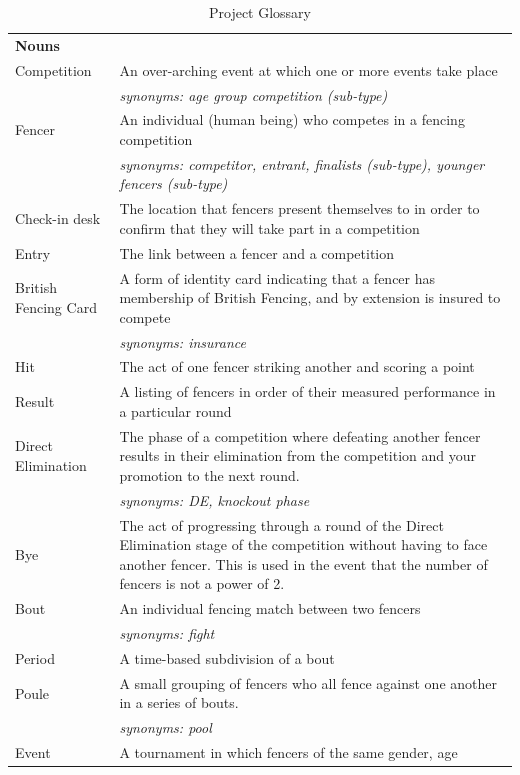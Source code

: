 \begin{center}
\begin{longtable}[l]{| p{} | p{} |} 
 \caption{\label{tab:ProjectGlossary}Project Glossary}
\hline
\textbf{Nouns} & \\ 
 Competition & An over-arching event at which one or more events
 take place \\
 & \textit{synonyms: age group competition (sub-type)} \\ 
 Fencer & An individual (human being) who competes in a fencing
 competition \\
 & \textit{synonyms: competitor, entrant, finalists (sub-type),
 younger fencers (sub-type)} \\
 Check-in desk & The location that fencers present themselves to
 in order to confirm that they will take part in a competition \\
 Entry & The link between a fencer and a competition \\
 British Fencing Card & A form of identity card indicating that a
 fencer has membership of British Fencing, and by extension is insured to
 compete \\
 & \textit{synonyms: insurance} \\
 Hit & The act of one fencer striking another and scoring a point \\
 Result & A listing of fencers in order of their measured performance in a 
 particular round \\
 Direct Elimination & The phase of a competition where defeating
 another fencer results in their elimination from the competition and your
 promotion to the next round. \\
 & \textit{synonyms: DE, knockout phase} \\
 Bye & The act of progressing through a round of the Direct
 Elimination stage of the competition without having to face another fencer.
 This is used in the event that the number of fencers is not a power of 2. \\
 Bout & An individual fencing match between two fencers \\
 & \textit{synonyms: fight} \\
 Period & A time-based subdivision of a bout \\
 Poule & A small grouping of fencers who all fence against one
 another in a series of bouts. \\
 & \textit{synonyms: pool} \\ 
 Event & A tournament in which fencers of the same gender, age

\end{longtable}
\end{center}
